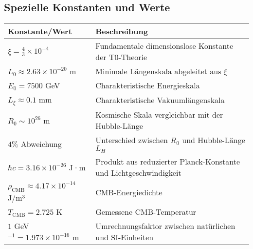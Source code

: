 \documentclass[12pt,a4paper]{article}
\numberwithin{equation}{section}
\begin{document}
	\subsection*{Spezielle Konstanten und Werte}
	
	\begin{longtable}{p{4cm} p{10cm}}
		\toprule
		\textbf{Konstante/Wert} & \textbf{Beschreibung} \\
		\midrule
		\endhead
		
		$\xi = \frac{4}{3} \times 10^{-4}$ & Fundamentale dimensionslose Konstante der T0-Theorie \\
		$L_0 \approx 2.63 \times 10^{-20}$ m & Minimale Längenskala abgeleitet aus $\xi$ \\
		$E_0 = 7500$ GeV & Charakteristische Energieskala \\
		$L_\xi \approx 0.1$ mm & Charakteristische Vakuumlängenskala \\
		$R_0 \sim 10^{26}$ m & Kosmische Skala vergleichbar mit der Hubble-Länge \\
		$4\%$ Abweichung & Unterschied zwischen $R_0$ und Hubble-Länge $L_H$ \\
		$\hbar c = 3.16 \times 10^{-26}$ J·m & Produkt aus reduzierter Planck-Konstante und Lichtgeschwindigkeit \\
		$\rho_{\text{CMB}} \approx 4.17 \times 10^{-14}$ J/m³ & CMB-Energiedichte \\
		$T_{\text{CMB}} = 2.725$ K & Gemessene CMB-Temperatur \\
		$1$ GeV$^{-1} = 1.973 \times 10^{-16}$ m & Umrechnungsfaktor zwischen natürlichen und SI-Einheiten \\
		\bottomrule
	\end{longtable}
	
\end{document}
